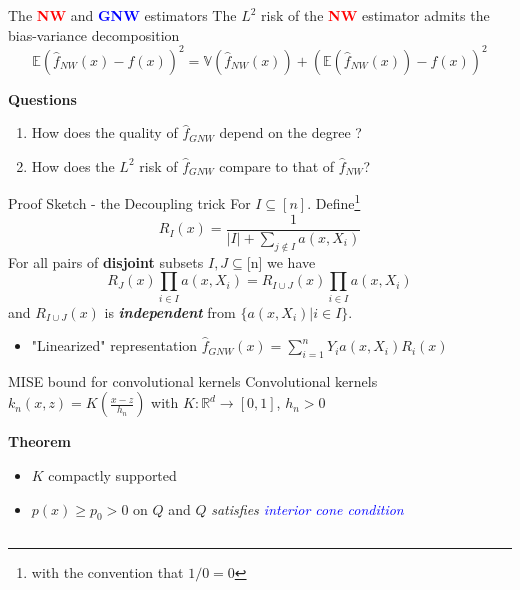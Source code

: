 \documentclass[final,dvipsnames]{beamer}
\newcommand{\myemph}[1]{\textcolor{blue}{#1}}
\newcommand{\myemphh}[1]{\textbf{\textcolor{blue}{#1}}}
\newcommand{\myemphr}[1]{\textbf{\textcolor{red}{#1}}}
\newcommand{\mycolbackwhite}[1]{
\hspace*{.01\linewidth}\begin{minipage}{.96\linewidth}
\begin{mdframed}[backgroundcolor=white!10,linewidth=3pt]
\vspace{10pt}
#1
\vspace{10pt}
\end{mdframed}
\end{minipage}
}
\newcommand{\mycolbackgreenw}[1]{
\hspace*{.01\linewidth}\begin{minipage}{.96\linewidth}
\begin{mdframed}[backgroundcolor=blue!10,linewidth=1pt]
\vspace{10pt}
#1
\vspace{10pt}
\end{mdframed}
\end{minipage}
}
\begin{document}
\begin{frame}
\begin{columns}[T]
\begin{column}{0.48\textwidth}
\begin{block}{The \myemphr{NW} and \myemphh{GNW} estimators}
\small The $L^2$ risk of the \myemphr{NW} estimator admits the bias-variance decomposition 
\vspace{10pt}
\begin{equation*}
    \mathbb{E}(\hat{f}_{NW}(x)-f(x))^2=\mathbb{V}(\hat{f}_{NW}(x))+(\mathbb{E}(\hat{f}_{NW}(x))-f(x))^2
\end{equation*}
\mycolbackgreenw{\textbf{Questions}
\vspace{10pt}
\begin{center}
    \begin{enumerate}
        \item How does the quality of $\hat{f}_{GNW}$ depend on the degree ?
        \vspace{10pt}
        \item How does the $L^2$ risk of $\hat{f}_{GNW}$ compare to that of $\hat{f}_{NW}$?
    \end{enumerate}
\end{center}
}
\end{block}
\begin{block}{Proof Sketch - the Decoupling trick}
    For $I\subseteq [n]$. Define\footnote{with the convention that $1/0=0$}  
    \begin{equation*}
        R_I(x)=
        \frac{1}{|I|+\sum_{j\notin I}a(x,X_i)}
    \end{equation*}
    \small For all pairs of \textbf{disjoint} subsets $I,J\subseteq$[n] we have
    \begin{equation*}
    R_J(x)\prod_{i\in I}a(x,X_i)=R_{I\cup J}(x)\prod_{i\in I}a(x,X_i)
    \end{equation*}
    \small and $R_{I\cup J}(x)$ is \textbf{\textit{independent}} from $\{a(x,X_i)|i\in I\}$.
    \vspace{20pt}
    \begin{itemize}
        \small \item "Linearized" representation 
     $\hat{f}_{GNW}(x)=\sum_{i=1}^nY_ia(x,X_i)R_i(x)$  
    \end{itemize}
\end{block}
\begin{block}{MISE bound for convolutional kernels}
    Convolutional kernels $k_n(x,z)=K(\frac{x-z}{h_n})$ with $K\colon\mathbb{R}^d\to [0,1]$, $h_n>0$
    \mycolbackwhite{\textbf{Theorem}
    \begin{itemize}
        \item $K$ compactly supported 
        \item $p(x)\geq p_0>0$ on $Q$ and $Q$ \textit{satisfies \myemph{interior cone condition}}

\end{itemize}}
\end{block}
\end{column}
\end{columns}
\end{frame}
\end{document}
